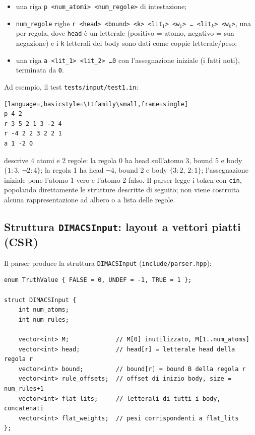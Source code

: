 \documentclass[11pt,a4paper]{article}
\begin{document}
\begin{itemize}
\item una riga \texttt{p <num\_atomi> <num\_regole>} di intestazione;
\item \texttt{num\_regole} righe \texttt{r <head> <bound> <k> <lit$_1$> <w$_1$> \dots\ <lit$_k$> <w$_k$>},
una per regola, dove \texttt{head} è un letterale (positivo = atomo, negativo = sua negazione) e
i \texttt{k} letterali del body sono dati come coppie letterale/peso;
\item una riga \texttt{a <lit\_1> <lit\_2> \dots 0} con l'assegnazione iniziale (i fatti noti),
terminata da \texttt{0}.
\end{itemize}

Ad esempio, il test \texttt{tests/input/test1.in}:

\begin{lstlisting}[language=,basicstyle=\ttfamily\small,frame=single]
p 4 2
r 3 5 2 1 3 -2 4
r -4 2 2 3 2 2 1
a 1 -2 0
\end{lstlisting}

descrive 4 atomi e 2 regole: la regola 0 ha head sull'atomo 3, bound 5 e body
$\{1:3,\, \lnot 2:4\}$; la regola 1 ha head $\lnot 4$, bound 2 e body $\{3:2,\,2:1\}$;
l'assegnazione iniziale pone l'atomo 1 vero e l'atomo 2 falso. Il parser legge i token con
\texttt{cin}, popolando direttamente le strutture descritte di seguito; non viene costruita alcuna
rappresentazione ad albero o a lista delle regole.

\subsection{Struttura \texttt{DIMACSInput}: layout a vettori piatti (CSR)}

Il parser produce la struttura \texttt{DIMACSInput} (\texttt{include/parser.hpp}):

\begin{lstlisting}
enum TruthValue { FALSE = 0, UNDEF = -1, TRUE = 1 };

struct DIMACSInput {
    int num_atoms;
    int num_rules;

    vector<int> M;             // M[0] inutilizzato, M[1..num_atoms]
    vector<int> head;          // head[r] = letterale head della regola r
    vector<int> bound;         // bound[r] = bound B della regola r
    vector<int> rule_offsets;  // offset di inizio body, size = num_rules+1
    vector<int> flat_lits;     // letterali di tutti i body, concatenati
    vector<int> flat_weights;  // pesi corrispondenti a flat_lits
};
\end{lstlisting}
\end{document}
